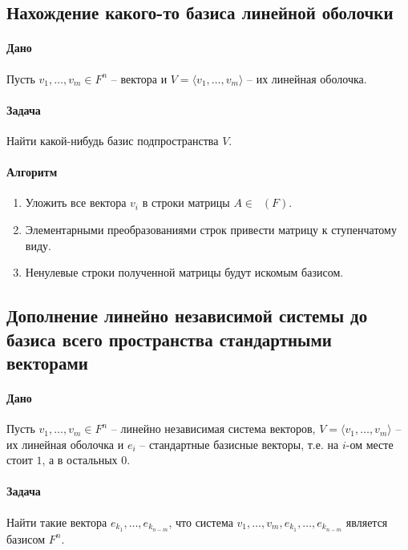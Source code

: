 \documentclass{article}
\newcommand{\MatrixDim}[3]{\mathop{\mathrm{M}_{#2\,#3}}(#1)}
\begin{document}
\subsection{Нахождение какого-то базиса линейной оболочки}

\paragraph{Дано} Пусть $v_1,\ldots,v_m\in F^n$ -- вектора и $V = \langle v_1,\ldots,v_m\rangle$ -- их линейная оболочка. 

\paragraph{Задача} Найти какой-нибудь базис подпространства $V$.

\paragraph{Алгоритм}
\begin{enumerate}
\item Уложить все вектора $v_i$ в строки матрицы $A\in \MatrixDim{F}{m}{n}$.

\item Элементарными преобразованиями строк привести матрицу к ступенчатому виду. 

\item Ненулевые строки полученной матрицы будут искомым базисом.
\end{enumerate}

\subsection{Дополнение линейно независимой системы до базиса всего пространства стандартными векторами}

\paragraph{Дано} Пусть $v_1,\ldots,v_m\in F^{n}$ -- линейно независимая система векторов, $V = \langle v_1,\ldots,v_m \rangle$ -- их линейная оболочка и $e_i$ -- стандартные базисные векторы, т.е. на $i$-ом месте стоит $1$, а в остальных $0$.

\paragraph{Задача} Найти такие вектора $e_{k_1},\ldots, e_{k_{n-m}}$, что система $v_1,\ldots,v_m,e_{k_1},\ldots,e_{k_{n-m}}$ является базисом $F^{n}$.
\end{document}
